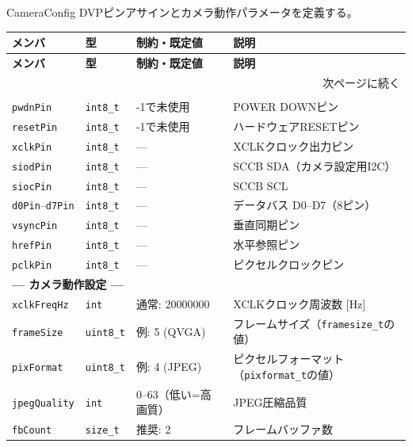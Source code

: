 \begin{funcblock}{CameraConfig}
DVPピンアサインとカメラ動作パラメータを定義する。

\begin{longtable}{l l l p{4.2cm}}
\toprule
\textbf{メンバ} & \textbf{型} & \textbf{制約・既定値} & \textbf{説明} \\
\midrule
\endfirsthead
\toprule
\textbf{メンバ} & \textbf{型} & \textbf{制約・既定値} & \textbf{説明} \\
\midrule
\endhead
\midrule
\multicolumn{4}{r}{\small 次ページに続く} \\
\endfoot
\bottomrule
\endlastfoot
\multicolumn{4}{l}{\textbf{--- DVPピンアサイン ---}} \\
\texttt{pwdnPin}    & \texttt{int8\_t} & -1で未使用         & POWER DOWNピン \\
\texttt{resetPin}   & \texttt{int8\_t} & -1で未使用         & ハードウェアRESETピン \\
\texttt{xclkPin}    & \texttt{int8\_t} & ---                & XCLKクロック出力ピン \\
\texttt{siodPin}    & \texttt{int8\_t} & ---                & SCCB SDA（カメラ設定用I2C） \\
\texttt{siocPin}    & \texttt{int8\_t} & ---                & SCCB SCL \\
\texttt{d0Pin}--\texttt{d7Pin} & \texttt{int8\_t} & --- & データバス D0--D7（8ピン） \\
\texttt{vsyncPin}   & \texttt{int8\_t} & ---                & 垂直同期ピン \\
\texttt{hrefPin}    & \texttt{int8\_t} & ---                & 水平参照ピン \\
\texttt{pclkPin}    & \texttt{int8\_t} & ---                & ピクセルクロックピン \\
\midrule
\multicolumn{4}{l}{\textbf{--- カメラ動作設定 ---}} \\
\texttt{xclkFreqHz}  & \texttt{int}     & 通常: 20000000   & XCLKクロック周波数 [Hz] \\
\texttt{frameSize}   & \texttt{uint8\_t} & 例: 5 (QVGA)    & フレームサイズ（\texttt{framesize\_t}の値） \\
\texttt{pixFormat}   & \texttt{uint8\_t} & 例: 4 (JPEG)    & ピクセルフォーマット（\texttt{pixformat\_t}の値） \\
\texttt{jpegQuality} & \texttt{int}     & 0--63（低い=高画質）& JPEG圧縮品質 \\
\texttt{fbCount}     & \texttt{size\_t} & 推奨: 2          & フレームバッファ数 \\
\end{longtable}
\end{funcblock}

